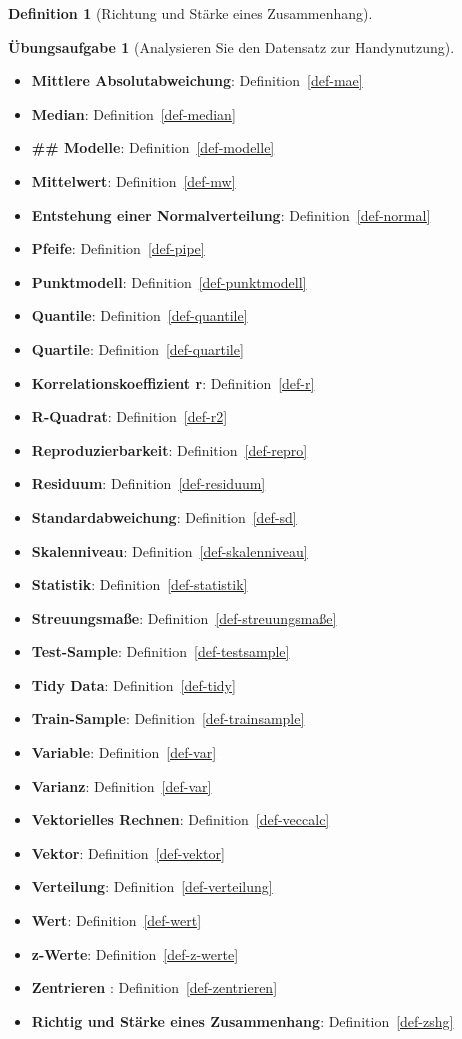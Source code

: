 \documentclass[
  a4paper,
  DIV=11]{scrreprt}
\theoremstyle{definition}
\newtheorem{exercise}{Übungsaufgabe}[chapter]
\theoremstyle{definition}
\theoremstyle{definition}
\newtheorem{definition}{Definition}[chapter]
\theoremstyle{remark}
\begin{document}
\begin{definition}[Richtung und Stärke eines
Zusammenhang]
\begin{exercise}[Analysieren Sie den Datensatz zur
Handynutzung]
\begin{itemize}
\item
  \textbf{Mittlere Absolutabweichung}: Definition~\ref{def-mae}
\item
  \textbf{Median}: Definition~\ref{def-median}
\item
  \textbf{\#\# Modelle}: Definition~\ref{def-modelle}
\item
  \textbf{Mittelwert}: Definition~\ref{def-mw}
\item
  \textbf{Entstehung einer Normalverteilung}:
  Definition~\ref{def-normal}
\item
  \textbf{Pfeife}: Definition~\ref{def-pipe}
\item
  \textbf{Punktmodell}: Definition~\ref{def-punktmodell}
\item
  \textbf{Quantile}: Definition~\ref{def-quantile}
\item
  \textbf{Quartile}: Definition~\ref{def-quartile}
\item
  \textbf{Korrelationskoeffizient r}: Definition~\ref{def-r}
\item
  \textbf{R-Quadrat}: Definition~\ref{def-r2}
\item
  \textbf{Reproduzierbarkeit}: Definition~\ref{def-repro}
\item
  \textbf{Residuum}: Definition~\ref{def-residuum}
\item
  \textbf{Standardabweichung}: Definition~\ref{def-sd}
\item
  \textbf{Skalenniveau}: Definition~\ref{def-skalenniveau}
\item
  \textbf{Statistik}: Definition~\ref{def-statistik}
\item
  \textbf{Streuungsmaße}: Definition~\ref{def-streuungsmaße}
\item
  \textbf{Test-Sample}: Definition~\ref{def-testsample}
\item
  \textbf{Tidy Data}: Definition~\ref{def-tidy}
\item
  \textbf{Train-Sample}: Definition~\ref{def-trainsample}
\item
  \textbf{Variable}: Definition~\ref{def-var}
\item
  \textbf{Varianz}: Definition~\ref{def-var}
\item
  \textbf{Vektorielles Rechnen}: Definition~\ref{def-veccalc}
\item
  \textbf{Vektor}: Definition~\ref{def-vektor}
\item
  \textbf{Verteilung}: Definition~\ref{def-verteilung}
\item
  \textbf{Wert}: Definition~\ref{def-wert}
\item
  \textbf{z-Werte}: Definition~\ref{def-z-werte}
\item
  \textbf{Zentrieren }: Definition~\ref{def-zentrieren}
\item
  \textbf{Richtig und Stärke eines Zusammenhang}:
  Definition~\ref{def-zshg}
\end{itemize}


\end{exercise}
\end{definition}
\end{document}
